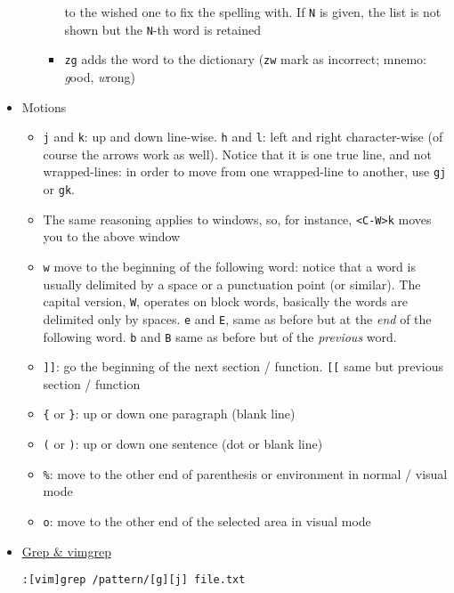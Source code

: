 \documentclass[a4paper,12pt,%
              final%
              ]{article}
\begin{document}
\begin{itemize}
\begin{itemize}
\begin{itemize}
            to the wished one to fix the spelling with. If \verb|N| is given, the
            list is not shown but the \verb|N|-th word is retained
          \item \verb|zg| adds the word to the dictionary (\verb|zw| mark as
            incorrect; mnemo: \emph{g}ood, \emph{w}rong)
        \end{itemize}
    \end{itemize}
  \item Motions
    \begin{itemize}
      \item \texttt{j} and \texttt{k}: up and down line-wise. \texttt{h} and
        \texttt{l}: left and right character-wise (of course the arrows work as
        well). Notice that it is one true line, and not wrapped-lines: in order to
        move from one wrapped-line to another, use \texttt{gj} or \texttt{gk}.
      \item The same reasoning applies to windows, so, for instance, \verb|<C-W>k|
        moves you to the above window
      \item \texttt{w} move to the beginning of the following word: notice that a
        word is usually delimited by a space or a punctuation point (or similar). The
        capital version, \texttt{W}, operates on block words, basically the words are
        delimited only by spaces. \texttt{e} and \texttt{E}, same as before but at
        the \emph{end} of the following word. \texttt{b} and \texttt{B} same as
        before but of the \emph{previous} word.
      \item \texttt{]]}: go the beginning of the next section / function. \texttt{[[}
        same but previous section / function
      \item \verb|{| or \verb|}|: up or down one paragraph (blank line)
      \item \verb|(| or \verb|)|: up or down one sentence (dot or blank line)
      \item \verb|%|: move to the other end of parenthesis or environment in normal
        / visual mode
      \item \verb|o|: move to the other end of the selected area in visual mode
    \end{itemize}
  \item \href{https://vim.fandom.com/wiki/Find_in_files_within_Vim}{Grep \& vimgrep}
\begin{verbatim}
:[vim]grep /pattern/[g][j] file.txt
\end{verbatim}
    \begin{itemize}

\end{itemize}
\end{itemize}
\end{document}
